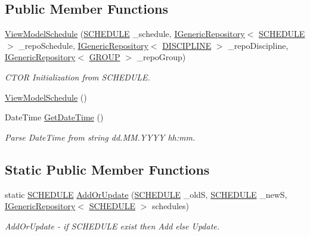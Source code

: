 \subsection*{Public Member Functions}
\begin{DoxyCompactItemize}
\item 
\hyperlink{class_in_study_asp_1_1_models_1_1_user_1_1_teacher_1_1_view_model_schedule_a2a6f9735138119885135e10599792ebc}{View\+Model\+Schedule} (\hyperlink{class_e_f_oracle_1_1_model_1_1_s_c_h_e_d_u_l_e}{S\+C\+H\+E\+D\+U\+LE} \+\_\+schedule, \hyperlink{interface_repo_1_1_common_1_1_i_generic_repository}{I\+Generic\+Repository}$<$ \hyperlink{class_e_f_oracle_1_1_model_1_1_s_c_h_e_d_u_l_e}{S\+C\+H\+E\+D\+U\+LE} $>$ \+\_\+repo\+Schedule, \hyperlink{interface_repo_1_1_common_1_1_i_generic_repository}{I\+Generic\+Repository}$<$ \hyperlink{class_e_f_oracle_1_1_model_1_1_d_i_s_c_i_p_l_i_n_e}{D\+I\+S\+C\+I\+P\+L\+I\+NE} $>$ \+\_\+repo\+Discipline, \hyperlink{interface_repo_1_1_common_1_1_i_generic_repository}{I\+Generic\+Repository}$<$ \hyperlink{class_e_f_oracle_1_1_model_1_1_g_r_o_u_p}{G\+R\+O\+UP} $>$ \+\_\+repo\+Group)
\begin{DoxyCompactList}\small\item\em C\+T\+OR Initialization from S\+C\+H\+E\+D\+U\+LE. \end{DoxyCompactList}\item 
\hyperlink{class_in_study_asp_1_1_models_1_1_user_1_1_teacher_1_1_view_model_schedule_aedd00ac53d0f727aa23665f21bf2db92}{View\+Model\+Schedule} ()
\item 
Date\+Time \hyperlink{class_in_study_asp_1_1_models_1_1_user_1_1_teacher_1_1_view_model_schedule_ae5be68b52f4ccbe4231fa9d3b2666048}{Get\+Date\+Time} ()
\begin{DoxyCompactList}\small\item\em Parse Date\+Time from string dd.\+M\+M.\+Y\+Y\+YY hh\+:mm. \end{DoxyCompactList}\end{DoxyCompactItemize}
\subsection*{Static Public Member Functions}
\begin{DoxyCompactItemize}
\item 
static \hyperlink{class_e_f_oracle_1_1_model_1_1_s_c_h_e_d_u_l_e}{S\+C\+H\+E\+D\+U\+LE} \hyperlink{class_in_study_asp_1_1_models_1_1_user_1_1_teacher_1_1_view_model_schedule_a478198b2582f08c56df1711971a08022}{Add\+Or\+Update} (\hyperlink{class_e_f_oracle_1_1_model_1_1_s_c_h_e_d_u_l_e}{S\+C\+H\+E\+D\+U\+LE} \+\_\+oldS, \hyperlink{class_e_f_oracle_1_1_model_1_1_s_c_h_e_d_u_l_e}{S\+C\+H\+E\+D\+U\+LE} \+\_\+newS, \hyperlink{interface_repo_1_1_common_1_1_i_generic_repository}{I\+Generic\+Repository}$<$ \hyperlink{class_e_f_oracle_1_1_model_1_1_s_c_h_e_d_u_l_e}{S\+C\+H\+E\+D\+U\+LE} $>$ schedules)
\begin{DoxyCompactList}\small\item\em Add\+Or\+Update -\/ if S\+C\+H\+E\+D\+U\+LE exist then Add else Update. \end{DoxyCompactList}\end{DoxyCompactItemize}
